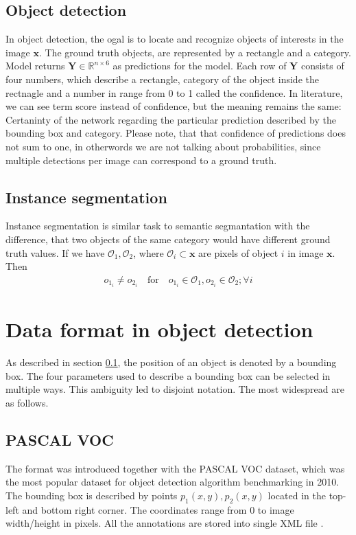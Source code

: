 \subsection{Object detection}
\label{subsec:object_detection}
In object detection, the ogal is to locate and recognize objects of interests in the image $\mathbf{x}$. The ground truth objects, are represented by a rectangle and a category. Model returns $\mathbf{Y} \in \mathbb{R}^{n \times 6}$ as predictions for the model. Each row of $\mathbf{Y}$ consists of four numbers, which describe a rectangle, category of the object inside the rectnagle and a number in range from 0 to 1 called the confidence. In literature, we can see term score instead of confidence, but the meaning remains the same: Certaninty of the network regarding the particular prediction described by the bounding box and category. Please note, that that confidence of predictions does not sum to one, in otherwords we are not talking about probabilities, since multiple detections per image can correspond to a ground truth.

\subsection{Instance segmentation}
Instance segmentation is similar task to semantic segmantation with the difference, that two objects of the same category would have different ground truth values. If we have $\mathcal{O}_1, \mathcal{O}_2$, where $\mathcal{O}_i \subset \mathbf{x}$ are pixels of object $i$ in image $\mathbf{x}$. Then
\begin{align}
    o_{1_i} \neq o_{2_i} \quad \text{for} \quad o_{1_i} \in \mathcal{O}_1, o_{2_i} \in \mathcal{O}_2;\forall i
\end{align}

\section{Data format in object detection}
As described in section \ref{subsec:object_detection}, the position of an object is denoted by a bounding box.  The four parameters used to describe a bounding box can be selected in multiple ways. This ambiguity led to disjoint notation. The most widespread are as follows.
\subsection{PASCAL VOC}
The format was introduced together with the PASCAL VOC dataset, which was the most popular dataset for object detection algorithm benchmarking in 2010. The bounding box is described by points $p_1(x,y),p_2(x,y)$ located in the top-left and bottom right corner. The coordinates range from 0 to image width/height in pixels. All the annotations are stored into single XML file \cite{Everingham2009,Padilla2021}.
